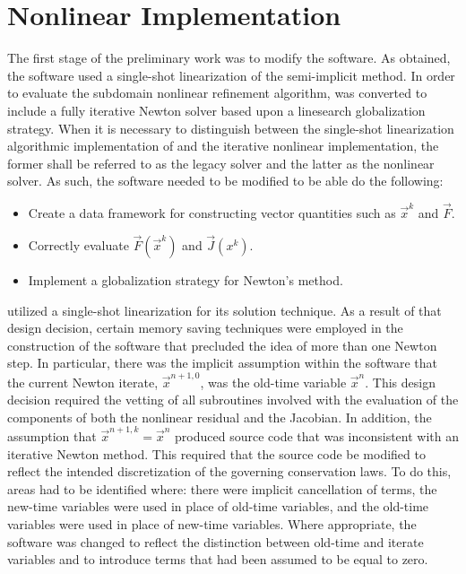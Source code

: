 \section{Nonlinear \cobra{} Implementation}
\label{sect:nl_cobra}  
The first stage of the preliminary work was to modify the \cobra{} software.
As obtained, the \cobra{} software used a single-shot linearization  of the semi-implicit method.
In order to evaluate the subdomain nonlinear refinement algorithm, \cobra{} was converted to include a fully iterative Newton solver based upon a linesearch globalization strategy.
When it is necessary to distinguish between the single-shot linearization algorithmic implementation of \cobra{} and the iterative nonlinear \cobra{} implementation, the former shall be referred to as the legacy solver and the latter as the nonlinear solver.
As such, the \cobra{} software needed to be modified to be able do the following:

\begin{itemize}
\item{Create a data framework for constructing vector quantities such as $\vec{x}^{k}$ and $\vec{F}$.}
\item{Correctly evaluate $\vec{F}(\vec{x}^{k})$ and $\vec{J}(x^{k})$.}
\item{Implement a globalization strategy for Newton's method.}
\end{itemize}

\cobra{} utilized a single-shot linearization for its solution technique.
As a result of that design decision, certain memory saving techniques were employed in the construction of the software that precluded the idea of more than one Newton step.
In particular, there was the implicit assumption within the software that the current Newton iterate, $\vec{x}^{n+1, 0}$, was the old-time variable $\vec{x}^{n}$.
This design decision required the vetting of all subroutines involved with the evaluation of the components of both the nonlinear residual and the Jacobian.
In addition, the assumption that $\vec{x}^{n+1, k} = \vec{x}^{n}$ produced source code that was inconsistent with an iterative Newton method.
This required that the source code be modified to reflect the intended discretization of the governing conservation laws.
To do this, areas had to be identified where: there were implicit cancellation of terms, the new-time variables were used in place of old-time variables, and the old-time variables were used in place of new-time variables.
Where appropriate, the software was changed to reflect the distinction between old-time and iterate variables and to introduce terms that had been assumed to be equal to zero.

